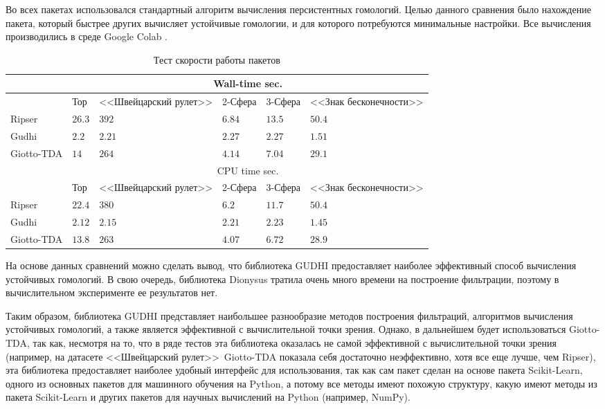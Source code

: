 Во всех пакетах использовался стандартный алгоритм вычисления персистентных гомологий. Целью данного сравнения было нахождение пакета, который быстрее других вычисляет устойчивые гомологии, и для которого потребуются минимальные настройки. Все вычисления производились в среде Google Colab \cite{colab}.
\begin{table}[!htbp]
	\centering
	\small
	\caption{Тест скорости работы пакетов}
	\begin{tabularx}{\linewidth}{|X|X|X|X|X|X|}
		\hline
		& \multicolumn{5}{c|}{Wall-time sec.} \\ \hline
		& Тор & <<Швейцарский рулет>> & 2-Сфера & 3-Сфера & <<Знак бесконечности>> \\ \hline
		Ripser & $26.3$ & $392$ & $6.84$ & $13.5$ & $50.4$ \\ \hline
		Gudhi & $2.2$ & $2.21$ & $2.27$ & $2.27$ & $1.51$ \\ \hline
		Giotto-TDA & $14$ & $264$ & $4.14$ & $7.04$ & $29.1$ \\ \hline
		& \multicolumn{5}{c|}{CPU time sec.} \\ \hline
		& Тор & <<Швейцарский рулет>> & 2-Сфера & 3-Сфера & <<Знак бесконечности>> \\ \hline
		Ripser & $22.4$ & $380$ & $6.2$ & $11.7$ & $50.4$ \\ \hline
		Gudhi & $2.12$ & $2.15$ & $2.21$ & $2.23$ & $1.45$ \\ \hline
		Giotto-TDA & $13.8$ & $263$ & $4.07$ & $6.72$ & $28.9$ \\ \hline
	\end{tabularx}	
	\label{tabl:tests}
\end{table}

На основе данных сравнений можно сделать вывод, что библиотека GUDHI предоставляет наиболее эффективный способ вычисления устойчивых гомологий. В свою очередь, библиотека Dionysus тратила очень много времени на построение фильтрации, поэтому в вычислительном эксперименте ее результатов нет.

Таким образом, библиотека GUDHI представляет наибольшее разнообразие методов построения фильтраций, алгоритмов вычисления устойчивых гомологий, а также является эффективной с вычислительной точки зрения. Однако, в дальнейшем будет использоваться Giotto-TDA, так как, несмотря на то, что в ряде тестов эта библиотека оказалась не самой эффективной с вычислительной точки зрения (например, на датасете <<Швейцарский рулет>>\ Giotto-TDA показала себя достаточно неэффективно, хотя все еще лучше, чем Ripser), эта библиотека предоставляет наиболее удобный интерфейс для использования, так как сам пакет сделан на основе пакета Scikit-Learn, одного из основных пакетов для машинного обучения на Python, а потому все методы имеют похожую структуру, какую имеют методы из пакета Scikit-Learn и других пакетов для научных вычислений на Python (например, NumPy).
